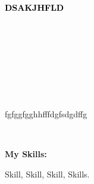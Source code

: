 \documentclass[9pt]{developercv} %
\begin{document}
    
    \begin{minipage}[t]{0.5\textwidth} 
    \vspace{-\baselineskip}
    
    \fontsize{16}{20} \textcolor{black}{\textbf{\MakeUppercase{dsakjhfld}}}
    
    \vspace{6pt}
    
    
    \end{minipage}
    \hfill
    \begin{minipage}[t]{0.2\textwidth}
      \vspace{-\baselineskip}
      
      \\
      \\
      \
      
    \end{minipage}
    \begin{minipage}[t]{0.27\textwidth}
      \vspace{-\baselineskip}
      
      \\
      \\
      \    
        
    \end{minipage}
    
    \begin{minipage}[t]{0.46\textwidth}
    \vspace{-6pt}

    fgfggfgghhfffdgfsdgdffg\\
    \end{minipage}
    \hfill
    \
    \begin{minipage}[t]{0.465\textwidth}
    \vspace{-6pt}
    
    
        \begin{minipage}[t]{0.2\textwidth}
        \textbf{My Skills:}
        \end{minipage}
        \hfill
        \begin{minipage}[t]{0.73\textwidth}
          Skill, Skill, Skill, Skills.
        \end{minipage}
        
    
    
    
\end{minipage}
    
\end{document}
